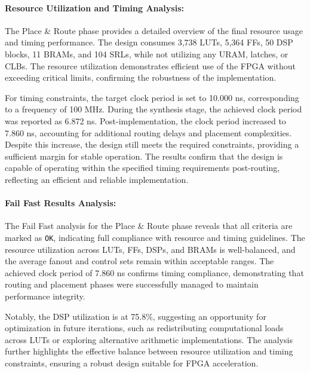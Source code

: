 \documentclass{article}
\begin{document}
\paragraph{Resource Utilization and Timing Analysis:}
The Place \& Route phase provides a detailed overview of the final resource usage and timing performance. The design consumes 3,738 LUTs, 5,364 FFs, 50 DSP blocks, 11 BRAMs, and 104 SRLs, while not utilizing any URAM, latches, or CLBs. The resource utilization demonstrates efficient use of the FPGA without exceeding critical limits, confirming the robustness of the implementation. 

For timing constraints, the target clock period is set to 10.000 ns, corresponding to a frequency of 100 MHz. During the synthesis stage, the achieved clock period was reported as 6.872 ns. Post-implementation, the clock period increased to 7.860 ns, accounting for additional routing delays and placement complexities. Despite this increase, the design still meets the required constraints, providing a sufficient margin for stable operation. The results confirm that the design is capable of operating within the specified timing requirements post-routing, reflecting an efficient and reliable implementation.

\paragraph{Fail Fast Results Analysis:}
The Fail Fast analysis for the Place \& Route phase reveals that all criteria are marked as \texttt{OK}, indicating full compliance with resource and timing guidelines. The resource utilization across LUTs, FFs, DSPs, and BRAMs is well-balanced, and the average fanout and control sets remain within acceptable ranges. The achieved clock period of 7.860 ns confirms timing compliance, demonstrating that routing and placement phases were successfully managed to maintain performance integrity.

Notably, the DSP utilization is at 75.8\%, suggesting an opportunity for optimization in future iterations, such as redistributing computational loads across LUTs or exploring alternative arithmetic implementations. The analysis further highlights the effective balance between resource utilization and timing constraints, ensuring a robust design suitable for FPGA acceleration.


\newpage
\end{document}

